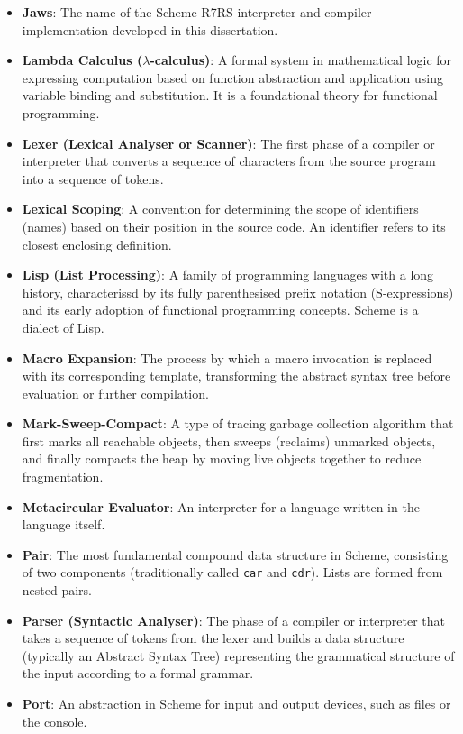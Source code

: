 \documentclass[final]{cmpreport_02}
\begin{document}
\begin{itemize}
    \item \textbf{Jaws}: The name of the Scheme R7RS interpreter and compiler implementation developed in this dissertation.
    \item \textbf{Lambda Calculus ($\lambda$-calculus)}: A formal system in mathematical logic for expressing computation based on function abstraction and application using variable binding and substitution. It is a foundational theory for functional programming.
    \item \textbf{Lexer (Lexical Analyser or Scanner)}: The first phase of a compiler or interpreter that converts a sequence of characters from the source program into a sequence of tokens.
    \item \textbf{Lexical Scoping}: A convention for determining the scope of identifiers (names) based on their position in the source code. An identifier refers to its closest enclosing definition.
    \item \textbf{Lisp (List Processing)}: A family of programming languages with a long history, characterissd by its fully parenthesised prefix notation (S-expressions) and its early adoption of functional programming concepts. Scheme is a dialect of Lisp.
    \item \textbf{Macro Expansion}: The process by which a macro invocation is replaced with its corresponding template, transforming the abstract syntax tree before evaluation or further compilation.
    \item \textbf{Mark-Sweep-Compact}: A type of tracing garbage collection algorithm that first marks all reachable objects, then sweeps (reclaims) unmarked objects, and finally compacts the heap by moving live objects together to reduce fragmentation.
    \item \textbf{Metacircular Evaluator}: An interpreter for a language written in the language itself.
    \item \textbf{Pair}: The most fundamental compound data structure in Scheme, consisting of two components (traditionally called \texttt{car} and \texttt{cdr}). Lists are formed from nested pairs.
    \item \textbf{Parser (Syntactic Analyser)}: The phase of a compiler or interpreter that takes a sequence of tokens from the lexer and builds a data structure (typically an Abstract Syntax Tree) representing the grammatical structure of the input according to a formal grammar.
    \item \textbf{Port}: An abstraction in Scheme for input and output devices, such as files or the console.

\end{itemize}
\end{document}
